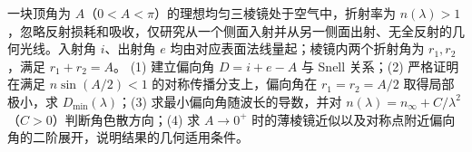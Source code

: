 一块顶角为 \(A\)（\(0<A<\pi\)）的理想均匀三棱镜处于空气中，折射率为 \(n(\lambda)>1\)，忽略反射损耗和吸收，仅研究从一个侧面入射并从另一侧面出射、无全反射的几何光线。入射角 \(i\)、出射角 \(e\) 均由对应表面法线量起；棱镜内两个折射角为 \(r_1,r_2\)，满足 \(r_1+r_2=A\)。
(1) 建立偏向角 \(D=i+e-A\) 与 Snell 关系；(2) 严格证明在满足 \(n\sin(A/2)<1\) 的对称传播分支上，偏向角在 \(r_1=r_2=A/2\) 取得局部极小，求 \(D_{\min}(\lambda)\)；(3) 求最小偏向角随波长的导数，并对 \(n(\lambda)=n_\infty+C/\lambda^2\)（\(C>0\)）判断角色散方向；(4) 求 \(A\to0^+\) 时的薄棱镜近似以及对称点附近偏向角的二阶展开，说明结果的几何适用条件。
